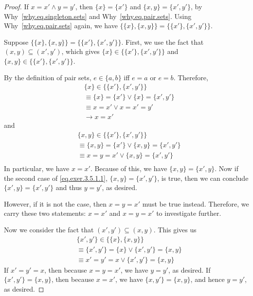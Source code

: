 \begin{proof}
	 If $x = x' \wedge y = y'$, then $\{x\} = \{x'\}$ and $\{x,y\} = \{x',y'\}$, by Why~\ref{why.eq.singleton.sets} and Why~\ref{why.eq.pair.sets}. Using Why~\ref{why.eq.pair.sets} again, we have $\{\{x\}, \{x,y\}\} = \{\{x'\}, \{x',y'\}\}$.
	
	 Suppose $\{\{x\}, \{x,y\}\} = \{\{x'\}, \{x',y'\}\}$. First, we use the fact that $(x,y) \subseteq (x',y')$, which gives $\{x\} \in \{\{x'\}, \{x',y'\}\}$ and $\{x,y\} \in \{\{x'\}, \{x',y'\}\}$.
	
	By the definition of pair sets, $e \in \{a,b\}$ iff $e = a$ or $e = b$. Therefore,
	\begin{align*}
		&\{x\} \in \{\{x'\}, \{x',y'\}\} \\
		&\equiv \{x\} = \{x'\} \vee \{x\} = \{x',y'\} \\
		&\equiv x = x' \vee x = x' = y' \\
		&\to x = x'
	\end{align*}
	and
	\begin{equation}\label{eq.exer.3.5.1.1}
	\begin{aligned}
		&\{x,y\} \in \{\{x'\}, \{x',y'\}\} \\
		&\equiv \{x,y\} = \{x'\} \vee \{x,y\} = \{x',y'\} \\
		&\equiv x=y=x' \vee \{x,y\} = \{x',y'\} \\
	\end{aligned}
	\end{equation}
	In particular, we have $x = x'$. Because of this, we have $\{x,y\} = \{x',y\}$. Now if the second case of \eqref{eq.exer.3.5.1.1}, $\{x,y\} = \{x',y'\}$, is true, then we can conclude $\{x',y\} = \{x',y'\}$ and thus $y = y'$, as desired.
	
	However, if it is not the case, then $x=y=x'$ must be true instead. Therefore, we carry these two statements: $x = x'$ and $x=y=x'$ to investigate further.

	Now we consider the fact that $(x',y') \subseteq (x,y)$. This gives us
	\begin{align*}
		&\{x',y'\} \in \{\{x\}, \{x,y\}\} \\
		&\equiv \{x',y'\} = \{x\} \vee \{x',y'\} = \{x,y\} \\
		&\equiv x'=y'=x \vee \{x',y'\} = \{x,y\}
	\end{align*}
	If $x' = y' = x$, then because $x=y=x'$, we have $y = y'$, as desired. If $\{x',y'\} = \{x,y\}$, then because $x = x'$, we have $\{x,y'\} = \{x,y\}$, and hence $y = y'$, as desired.
	

\end{proof}
